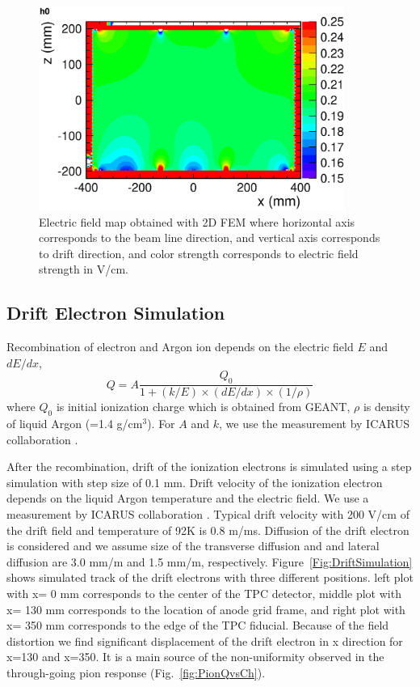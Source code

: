 \begin{figure}[htbp]
 \begin{center}
  \includegraphics[width=100mm]{fig/2DFieldMap.eps}
 \end{center}
 \caption{Electric field map obtained with 2D FEM where
horizontal axis corresponds to the beam line direction,
and vertical axis corresponds to drift direction,
and color strength corresponds to electric field strength in V/cm.
}
 \label{Fig:2DFieldMap}
\end{figure}

\subsection{Drift Electron Simulation}

Recombination of electron and Argon ion depends on
the electric field $E$ and $dE/dx$,
\begin{equation}
  Q = A\frac{Q_{0}}{1+(k/E)\times(dE/dx)\times(1/\rho)}
\end{equation}
where $Q_{0}$ is initial ionization charge which is obtained from GEANT, $\rho$ is density of liquid Argon (=1.4 g/cm$^3$).
For $A$ and $k$, we use the measurement by ICARUS collaboration \cite{658352}.

After the recombination, drift of the ionization electrons is simulated
using a step simulation with step size of 0.1 mm.
Drift velocity of the ionization electron depends on the liquid Argon temperature
and the electric field. We use a measurement by ICARUS collaboration \cite{649233}.
Typical drift velocity with 200 V/cm of the drift field and temperature of 92K is 0.8 m/ms.
Diffusion of the drift electron is considered and we assume size of the transverse diffusion and and lateral diffusion
are 3.0 mm/m and 1.5 mm/m, respectively.
Figure~\ref{Fig:DriftSimulation} shows simulated track of the drift electrons with three different positions.
left plot with x= 0 mm corresponds to the center of the TPC detector, 
middle plot with x= 130 mm corresponds to the location of anode grid frame,
and right plot with x= 350 mm corresponds to the edge of the TPC fiducial.
Because of the field distortion we find significant displacement of the drift electron in
x direction for x=130 and x=350. It is a main source of the non-uniformity observed in 
the through-going pion response (Fig.~\ref{fig:PionQvsCh}).

